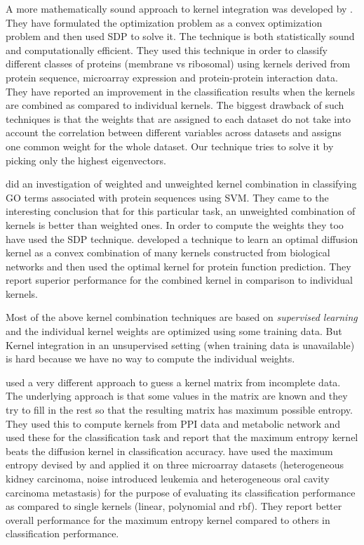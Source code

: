 A more mathematically sound approach to kernel integration was developed by \citet{lanck04kerneldatafusion}. They have formulated the optimization 
problem as a convex optimization problem and then used \ac{SDP} to solve it. The technique is both statistically sound and computationally efficient. 
They used this technique in order to classify different classes of proteins (membrane vs ribosomal) using kernels derived from protein 
sequence, microarray expression and protein-protein interaction data. They have reported an improvement in the classification results when 
the kernels are combined as compared to individual kernels. The biggest drawback of such techniques is that the weights that are assigned to each 
dataset do not take into account the correlation between different variables across datasets and assigns one common weight for the 
whole dataset. Our technique tries to solve it by picking only the highest eigenvectors.

\citet{lewis06svm} did an investigation of weighted and unweighted kernel combination in classifying GO terms associated with protein 
sequences using SVM. They came to the interesting conclusion that for this particular task, an unweighted combination of kernels 
is better than weighted ones. In order to compute the weights they too have used the SDP technique. \citet{Liang2008Adaptive} 
developed a technique to learn an optimal diffusion kernel as a convex combination of many kernels constructed from biological networks 
and then used the optimal kernel for protein function prediction. They report superior performance for the combined kernel 
in comparison to individual kernels. 

Most of the above kernel combination techniques are based on \textit{supervised learning} and the individual kernel weights are 
optimized using some training data. But Kernel integration in an unsupervised setting (when training data is unavailable) is hard 
because we have no way to compute the individual weights. 

\citet{Tsuda2004Learning} used a very different approach to guess a kernel matrix from incomplete data. The underlying approach is that some 
values in the matrix are known and they try to fill in the rest so that the resulting matrix has maximum possible entropy. 
They used this to compute kernels from PPI data and metabolic network and used these for the classification task and report that 
the maximum entropy kernel beats the diffusion kernel in classification accuracy. \citet{fujibuchi2007classification} have used the maximum 
entropy devised by \citet{Tsuda2004Learning} and applied it on three microarray datasets (heterogeneous kidney carcinoma, noise introduced 
leukemia and heterogeneous oral cavity carcinoma metastasis) for the purpose of evaluating its classification performance as compared to 
single kernels (linear, polynomial and rbf). They report better overall performance for the maximum entropy kernel compared 
to others in classification performance.  

